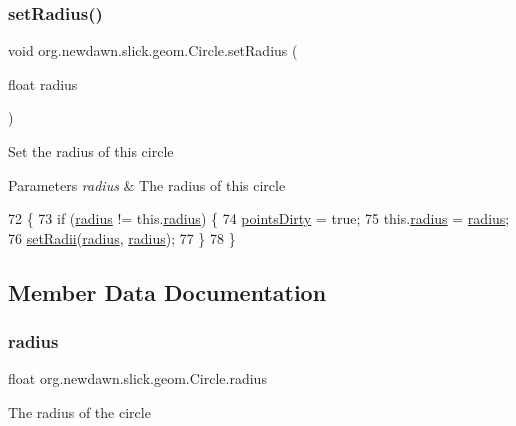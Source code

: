 \subsubsection{\texorpdfstring{set\+Radius()}{setRadius()}}
{\footnotesize\ttfamily void org.\+newdawn.\+slick.\+geom.\+Circle.\+set\+Radius (\begin{DoxyParamCaption}\item[{float}]{radius }\end{DoxyParamCaption})\hspace{0.3cm}{\ttfamily [inline]}}

Set the radius of this circle


\begin{DoxyParams}{Parameters}
{\em radius} & The radius of this circle \\
\hline
\end{DoxyParams}

\begin{DoxyCode}
72                                         \{
73         \textcolor{keywordflow}{if} (\mbox{\hyperlink{classorg_1_1newdawn_1_1slick_1_1geom_1_1_circle_a4ca88ec1c6b329912a60e4dd02ccdf5a}{radius}} != this.\mbox{\hyperlink{classorg_1_1newdawn_1_1slick_1_1geom_1_1_circle_a4ca88ec1c6b329912a60e4dd02ccdf5a}{radius}}) \{
74             \mbox{\hyperlink{classorg_1_1newdawn_1_1slick_1_1geom_1_1_shape_a61fe1954d2fdefc72c34b284f4fcfdb4}{pointsDirty}} = \textcolor{keyword}{true};
75             this.\mbox{\hyperlink{classorg_1_1newdawn_1_1slick_1_1geom_1_1_circle_a4ca88ec1c6b329912a60e4dd02ccdf5a}{radius}} = \mbox{\hyperlink{classorg_1_1newdawn_1_1slick_1_1geom_1_1_circle_a4ca88ec1c6b329912a60e4dd02ccdf5a}{radius}};
76             \mbox{\hyperlink{classorg_1_1newdawn_1_1slick_1_1geom_1_1_ellipse_a3cf63c73d9aa79988a4f2d68cf2611c1}{setRadii}}(\mbox{\hyperlink{classorg_1_1newdawn_1_1slick_1_1geom_1_1_circle_a4ca88ec1c6b329912a60e4dd02ccdf5a}{radius}}, \mbox{\hyperlink{classorg_1_1newdawn_1_1slick_1_1geom_1_1_circle_a4ca88ec1c6b329912a60e4dd02ccdf5a}{radius}});
77         \}
78     \}
\end{DoxyCode}


\subsection{Member Data Documentation}
\mbox{\label{classorg_1_1newdawn_1_1slick_1_1geom_1_1_circle_a4ca88ec1c6b329912a60e4dd02ccdf5a}} 
\subsubsection{\texorpdfstring{radius}{radius}}
{\footnotesize\ttfamily float org.\+newdawn.\+slick.\+geom.\+Circle.\+radius}

The radius of the circle 